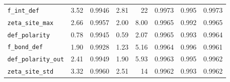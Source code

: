 \begin{table}[p]
\begin{tabular}{lrrrrrrr}
\texttt{f\_int\_def} & 3.52 & 0.9946 & 2.81 & 22 & 0.9973 & 0.995 & 0.9973 \\
\texttt{zeta\_site\_max} & 2.66 & 0.9957 & 2.00 & 8.00 & 0.9965 & 0.992 & 0.9965 \\
\texttt{def\_polarity} & 0.78 & 0.9945 & 0.59 & 2.07 & 0.9965 & 0.993 & 0.9964 \\
\texttt{f\_bond\_def} & 1.90 & 0.9928 & 1.23 & 5.16 & 0.9964 & 0.996 & 0.9961 \\
\texttt{def\_polarity\_out} & 2.41 & 0.9949 & 1.90 & 5.93 & 0.9963 & 0.995 & 0.9962 \\
\texttt{zeta\_site\_std} & 3.32 & 0.9960 & 2.51 & 14 & 0.9962 & 0.993 & 0.9962 \\
\bottomrule
\end{tabular}
\end{table}

